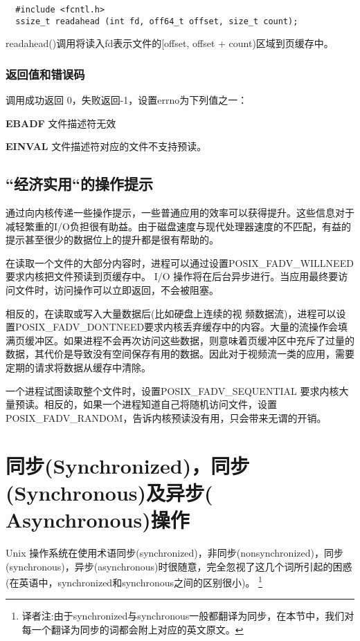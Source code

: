\begin{lstlisting}
  #include <fcntl.h>
  ssize_t readahead (int fd, off64_t offset, size_t count);
\end{lstlisting}

readahead()调用将读入fd表示文件的[offset, offset + count)区域到页缓存中。

\subsubsection{返回值和错误码}

调用成功返回 0，失败返回-1，设置errno为下列值之一：

\begin{eqlist*}
\item[\textbf{EBADF}] 文件描述符无效
\item[\textbf{EINVAL}] 文件描述符对应的文件不支持预读。
\end{eqlist*}

\subsection{“经济实用“的操作提示}

通过向内核传递一些操作提示，一些普通应用的效率可以获得提升。这些信息对于减轻繁重的I/O负担很有助益。由于磁盘速度与现代处理器速度的不匹配，有益的提示甚至很少的数据位上的提升都是很有帮助的。

在读取一个文件的大部分内容时，进程可以通过设置POSIX\_FADV\_WILLNEED 要求内核把文件预读到页缓存中。 I/O 操作将在后台异步进行。当应用最终要访问文件时，访问操作可以立即返回，不会被阻塞。

相反的，在读取或写入大量数据后(比如硬盘上连续的视 频数据流)，进程可以设置POSIX\_FADV\_DONTNEED要求内核丢弃缓存中的内容。大量的流操作会填满页缓冲区。如果进程不会再次访问这些数据，则意味着页缓冲区中充斥了过量的数据，其代价是导致没有空间保存有用的数据。因此对于视频流一类的应用，需要定期的请求将数据从缓存中清除。

一个进程试图读取整个文件时，设置POSIX\_FADV\_SEQUENTIAL 要求内核大量预读。相反的，如果一个进程知道自己将随机访问文件，设置POSIX\_FADV\_RANDOM，告诉内核预读没有用，只会带来无谓的开销。

\section{同步(Synchronized)，同步(Synchronous)及异步( Asynchronous)操作}

Unix 操作系统在使用术语同步(synchronized)，非同步(nonsynchronized)，同步(synchronous)，异步(asynchronous)时很随意，完全忽视了这几个词所引起的困惑(在英语中，synchronized和synchronous之间的区别很小)。 \footnote{译者注:由于synchronized与synchronous一般都翻译为同步，在本节中，我们对每一个翻译为同步的词都会附上对应的英文原文。}

